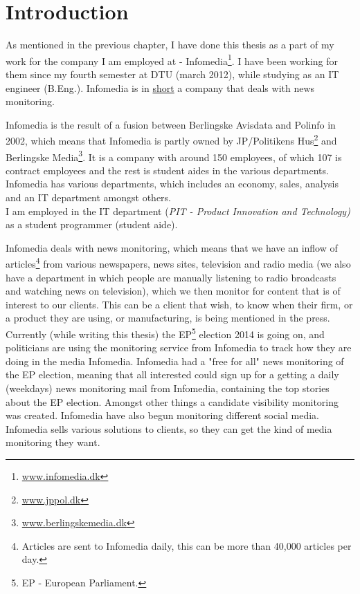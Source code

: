 \chapter{Introduction}
As mentioned in the previous chapter, I have done this thesis as a part of my work for the company I am employed at - Infomedia\footnote{\url{www.infomedia.dk}}. I have been working for them since my fourth semester at DTU (march 2012), while studying as an IT engineer (B.Eng.). Infomedia is in \underline{short} a company that deals with news monitoring.

Infomedia is the result of a fusion between Berlingske Avisdata and Polinfo in 2002, which means that Infomedia is partly owned by JP/Politikens Hus\footnote{\url{www.jppol.dk}} and Berlingske Media\footnote{\url{www.berlingskemedia.dk}}. It is a company with around 150 employees, of which 107 is contract employees and the rest is student aides in the various departments. Infomedia has various departments, which includes an economy, sales, analysis and an IT department amongst others.\\
I am employed in the IT department (\textit{PIT - Product Innovation and Technology)} as a student programmer (student aide).

Infomedia deals with news monitoring, which means that we have an inflow of articles\footnote{Articles are sent to Infomedia daily, this can be more than 40,000 articles per day.} from various newspapers, news sites, television and radio media (we also have a department in which people are manually listening to radio broadcasts and watching news on television), which we then monitor for content that is of interest to our clients.  This can be a client that wish, to know when their firm, or a product they are using, or manufacturing, is being mentioned in the press. 
Currently (while writing this thesis) the EP\footnote{EP - European Parliament.} election 2014 is going on, and politicians are using the monitoring service from Infomedia to track how they are doing in the media Infomedia\cite{EuropaValg}. Infomedia had a "free for all" news monitoring of the EP election, meaning that all interested could sign up for a getting a daily (weekdays) news monitoring mail from Infomedia, containing the top stories about the EP election. Amongst other things a candidate visibility monitoring was created\cite{InfomediaEpKandidater}. Infomedia have also begun monitoring different social media. Infomedia sells various solutions to clients, so they can get the kind of media monitoring they want.

